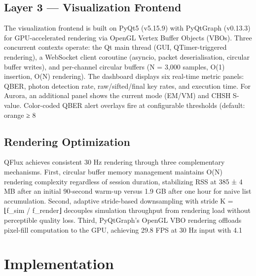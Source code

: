 \subsection{Layer 3 — Visualization Frontend}
The visualization frontend is built on PyQt5 (v5.15.9) with PyQtGraph (v0.13.3) for GPU-accelerated rendering via OpenGL Vertex Buffer Objects (VBOs). Three concurrent contexts operate: the Qt main thread (GUI, QTimer-triggered rendering), a WebSocket client coroutine (asyncio, packet deserialisation, circular buffer writes), and per-channel circular buffers (N = 3,000 samples, O(1) insertion, O(N) rendering). The dashboard displays six real-time metric panels: QBER, photon detection rate, raw/sifted/final key rates, and execution time. For Aurora, an additional panel shows the current mode (EM/VM) and CHSH S-value. Color-coded QBER alert overlays fire at configurable thresholds (default: orange ≥ 8%

\subsection{Rendering Optimization}
QFlux achieves consistent 30 Hz rendering through three complementary mechanisms. First, circular buffer memory management maintains O(N) rendering complexity regardless of session duration, stabilizing RSS at 385 ± 4 MB after an initial 90-second warm-up versus 1.9 GB after one hour for naive list accumulation. Second, adaptive stride-based downsampling with stride K = ⌊f_sim / f_render⌋ decouples simulation throughput from rendering load without perceptible quality loss. Third, PyQtGraph's OpenGL VBO rendering offloads pixel-fill computation to the GPU, achieving 29.8 FPS at 30 Hz input with 4.1%

\section{Implementation}
